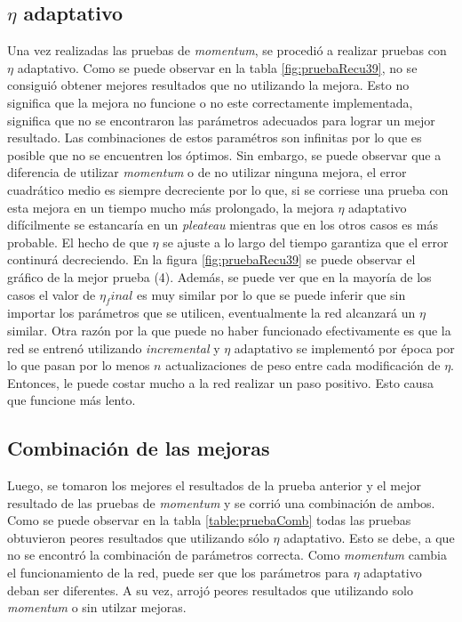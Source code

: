 \documentclass[11pt,a4paper]{article}
\begin{document}
   
\subsection{\texorpdfstring{$\eta$ adaptativo}{Tasa de aprendizaje adaptativa}}

Una vez realizadas las pruebas de \emph{momentum}, se procedió a realizar pruebas con $\eta$ adaptativo. Como se puede observar en la tabla \ref{fig:pruebaRecu39}, no se consiguió obtener mejores resultados que no utilizando la mejora. Esto no significa que la mejora no funcione o no este correctamente implementada, significa que no se encontraron las parámetros adecuados para lograr un mejor resultado. Las combinaciones de estos paramétros son infinitas por lo que es posible que no se encuentren los óptimos. Sin embargo, se puede observar que a diferencia de utilizar \emph{momentum} o de no utilizar ninguna mejora, el error cuadrático medio es siempre decreciente por lo que, si se corriese una prueba con esta mejora en un tiempo mucho más prolongado, la mejora $\eta$ adaptativo difícilmente se estancaría en un \emph{pleateau} mientras que en los otros casos es más probable. El hecho de que $\eta$ se ajuste a lo largo del tiempo garantiza que el error continurá decreciendo. En la figura \ref{fig:pruebaRecu39} se puede observar el gráfico de la mejor prueba (4). Además, se puede ver que en la mayoría de los casos el valor de $\eta_final$ es muy similar por lo que se puede inferir que sin importar los parámetros que se utilicen, eventualmente la red alcanzará un $\eta$ similar. Otra razón por la que puede no haber funcionado efectivamente es que la red se entrenó utilizando \emph{incremental} y $\eta$ adaptativo se implementó por época por lo que pasan por lo menos $n$ actualizaciones de peso entre cada modificación de $\eta$. Entonces, le puede costar mucho a la red realizar un paso positivo. Esto causa que funcione más lento.

\subsection{Combinación de las mejoras}

Luego, se tomaron los mejores el resultados de la prueba anterior y el mejor resultado de las pruebas de \emph{momentum} y se corrió una combinación de ambos. Como se puede observar en la tabla \ref{table:pruebaComb} todas las pruebas obtuvieron peores resultados que utilizando sólo $\eta$ adaptativo. Esto se debe, a que no se encontró la combinación de parámetros correcta.  Como \emph{momentum} cambia el funcionamiento de la red, puede ser que los parámetros para $\eta$ adaptativo deban ser diferentes. A su vez, arrojó peores resultados que utilizando solo \emph{momentum} o sin utilzar mejoras.
\end{document}
